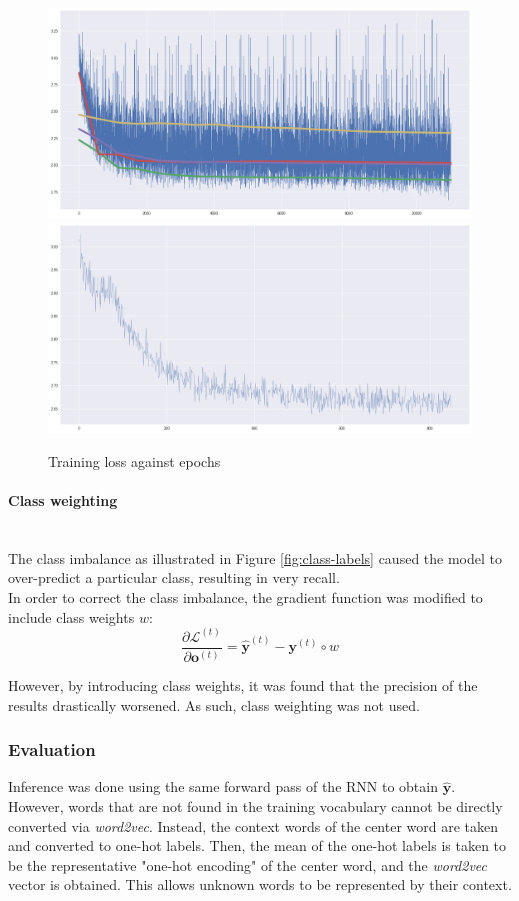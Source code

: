 \documentclass{article}
\begin{document}
\begin{figure}[h]
	\centering
	\includegraphics[width=0.45\linewidth]{assets/loss_nobatch.png}
	\includegraphics[width=0.45\linewidth]{assets/loss_batch.png}
	\caption{Training loss against epochs}
	\label{fig:batch-updates}	
\end{figure}

\paragraph{Class weighting}\mbox{}\\
The class imbalance as illustrated in Figure \ref{fig:class-labels} caused the model to over-predict a particular class, resulting in very recall.\\

In order to correct the class imbalance, the gradient function was modified to include class weights $w$:
	$$ \frac{\partial \mathcal{L}^{(t)}}{\partial \bm{o}^{(t)}}
		= \hat{\bm{y}}^{(t)} - \bm{y}^{(t)} \circ w $$

However, by introducing class weights, it was found that the precision of the results drastically worsened. As such, class weighting was not used.

\subsubsection{Evaluation}
Inference was done using the same forward pass of the RNN to obtain $\hat{\bm{y}}$.\\

However, words that are not found in the training vocabulary cannot be directly converted via \emph{word2vec}. Instead, the context words of the center word are taken and converted to one-hot labels. Then, the mean of the one-hot labels is taken to be the representative "one-hot encoding" of the center word, and the \emph{word2vec} vector is obtained. This allows unknown words to be represented by their context.
\end{document}
